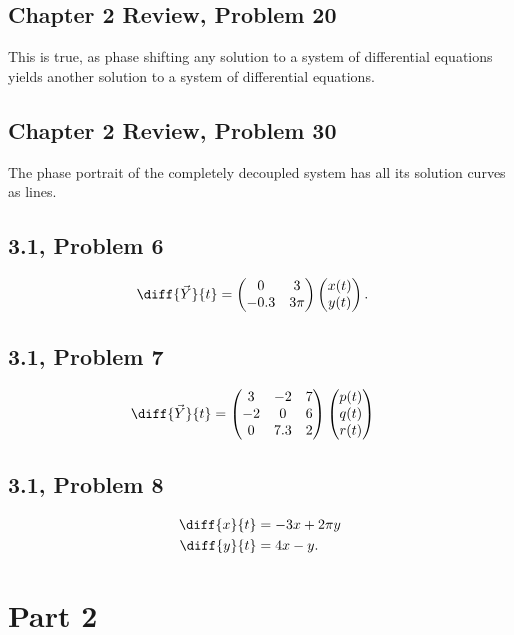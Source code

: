 \documentclass[10pt]{mypackage}
\begin{document}
\subsection{Chapter 2 Review, Problem 20}%
This is true, as phase shifting any solution to a system of differential equations yields another solution to a system of differential equations.
\subsection{Chapter 2 Review, Problem 30}%
The phase portrait of the completely decoupled system has all its solution curves as lines.
\subsection{3.1, Problem 6}%
\begin{align*}
  \diff{\vec{Y}}{t} &= \begin{pmatrix}0 & 3 \\ -0.3 & 3\pi\end{pmatrix} \begin{pmatrix}x(t)\\y(t)\end{pmatrix}.
\end{align*}
\subsection{3.1, Problem 7}%
\begin{align*}
  \diff{\vec{Y}}{t} &= \begin{pmatrix}3 & -2 & 7 \\ -2 & 0 & 6 \\ 0 & 7.3 & 2\end{pmatrix} \begin{pmatrix}p(t)\\q(t)\\r(t)\end{pmatrix}
\end{align*}
\subsection{3.1, Problem 8}%
\begin{align*}
  \diff{x}{t} &= -3x + 2\pi y\\
  \diff{y}{t} &= 4x-y.
\end{align*}
\section{Part 2}%
\end{document}
